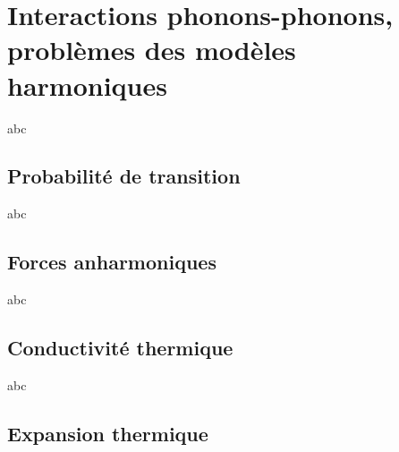 \chapter{Interactions phonons-phonons, problèmes des modèles harmoniques}

abc

\section{Probabilité de transition}
abc
\section{Forces anharmoniques}
abc
\section{Conductivité thermique}
abc
\section{Expansion thermique}

